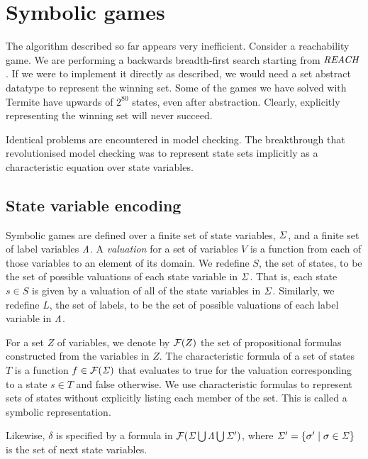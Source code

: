 \section{Symbolic games}
\label{sec:symbolic_games}

The algorithm described so far appears very inefficient. Consider a reachability game. We are performing a backwards breadth-first search starting from $\mathit{REACH}$. If we were to implement it directly as described, we would need a set abstract datatype to represent the winning set. Some of the games we have solved with Termite have upwards of $2^{80}$ states, even after abstraction. Clearly, explicitly representing the winning set will never succeed. 

Identical problems are encountered in model checking. The breakthrough that revolutionised model checking was to represent state sets implicitly as a characteristic equation over state variables.

\subsection{State variable encoding}

Symbolic games are defined over a finite set of state variables, $\mathit{\Sigma}$, and a finite set of label variables $\mathit{\Lambda}$. A \emph{valuation} for a set of variables $V$ is a function from each of those variables to an element of its domain. We redefine $S$, the set of states, to be the set of possible valuations of each state variable in $\mathit{\Sigma}$. That is, each state $s \in S$ is given by a valuation of all of the state variables in $\mathit{\Sigma}$. Similarly, we redefine $L$, the set of labels, to be the set of possible valuations of each label variable in $\mathit{\Lambda}$.

For a set $Z$ of variables, we denote by $\mathcal{F}(Z)$ the set of propositional formulas constructed from the variables in $Z$. The characteristic formula of a set of states $T$ is a function $f \in \mathcal{F}(\mathit{\Sigma})$ that evaluates to true for the valuation corresponding to a state $s \in T$ and false otherwise. We use characteristic formulas to represent sets of states without explicitly listing each member of the set. This is called a symbolic representation. 

Likewise, $\delta$ is specified by a formula in $\mathcal{F}(\mathit{\Sigma} \bigcup \mathit{\Lambda} \bigcup \mathit{\Sigma}')$, where $\mathit{\Sigma}' = \{\sigma' \mid \sigma \in \mathit{\Sigma} \}$ is the set of next state variables.

